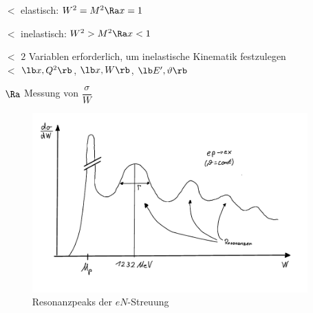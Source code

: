 \begin{itemize}
\item[$\lt$] elastisch: $W^2 = M^2 \Ra x=1$
\item[$\lt$] inelastisch: $W^2 > M^2 \Ra x<1$
\item[$\lt$] $\boxed{2}$ Variablen erforderlich, um inelastische Kinematik festzulegen\\
$\lt$ $\lb x, Q^2\rb $, $\lb x, W\rb $, $\lb E^\prime, \vartheta\rb $
\item[$\Ra$] Messung von $\dfrac{\sigma}{W}$

\begin{figure}[!ht]
\centering
\includegraphics[width=.6\textwidth]{imgs/ep5-fig-6-5.pdf}
\caption{Resonanzpeaks der $eN$-Streuung\label{fig:6.5}}
\end{figure}


\end{itemize}
